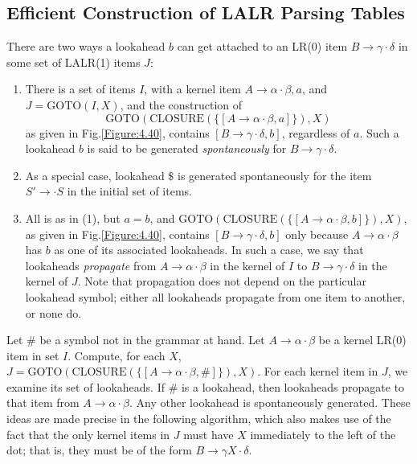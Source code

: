 \documentclass[12pt,a4paper,twoside,openany]{book}
\begin{document}
\subsection{Efficient Construction of LALR Parsing Tables}

There are two ways a lookahead $b$ can get attached to an LR(0) item $B\rightarrow\gamma\cdot\delta$ in some set of LALR(1) items $J$:
\begin{enumerate}
    \item There is a set of items $I$, with a kernel item $A\rightarrow\alpha\cdot\beta,a$, and $J=\mathrm{GOTO}(I,X)$, and the construction of $$\text{GOTO}(\text{CLOSURE}(\{[A\rightarrow\alpha\cdot\beta,a]\}),X)$$ as given in Fig.\;\ref{Figure:4.40}, contains $[B\rightarrow\gamma\cdot\delta,b]$, regardless of $a$. Such a lookahead $b$ is said to be generated \textit{spontaneously} for $B\rightarrow\gamma\cdot\delta$.
    \item As a special case, lookahead $\mathdollar$ is generated spontaneously for the item $S'\rightarrow\cdot S$ in the initial set of items.
    \item All is as in (1), but $a=b$, and $\text{GOTO}(\text{CLOSURE}(\{[A\rightarrow\alpha\cdot\beta,b]\}),X)$, as given in Fig.\;\ref{Figure:4.40}, contains $[B\rightarrow\gamma\cdot\delta,b]$ only because $A\rightarrow\alpha\cdot\beta$ has $b$ as one of its associated lookaheads. In such a case, we say that lookaheads \textit{propagate} from $A\rightarrow\alpha\cdot\beta$ in the kernel of $I$ to $B\rightarrow\gamma\cdot\delta$ in the kernel of $J$. Note that propagation does not depend on the particular lookahead symbol; either all lookaheads propagate from one item to another, or none do.
\end{enumerate}

Let \# be a symbol not in the grammar at hand. Let $A\rightarrow\alpha\cdot\beta$ be a kernel LR(0) item in set $I$. Compute, for each $X$, $J=\text{GOTO}(\text{CLOSURE}(\{[A\rightarrow\alpha\cdot\beta,\#]\}),X)$. For each kernel item in $J$, we examine its set of lookaheads. If \# is a lookahead, then lookaheads propagate to that item from $A\rightarrow\alpha\cdot\beta$. Any other lookahead is spontaneously generated. These ideas are made precise in the following algorithm, which also makes use of the fact that the only kernel items in $J$ must have $X$ immediately to the left of the dot; that is, they must be of the form $B\rightarrow\gamma X\cdot\delta$.

\end{document}
